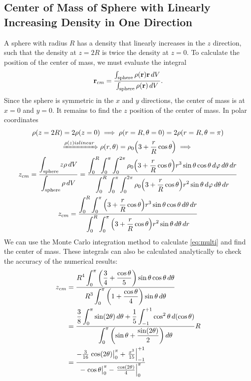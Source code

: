 \documentclass[12pt,a4paper]{article}
\newcommand{\ddfrac}[2]{{\displaystyle\frac{\displaystyle #1}{\displaystyle #2}}}
\begin{document}
    \subsection{Center of Mass of Sphere with Linearly Increasing Density in One Direction}
    A sphere with radius $R$ has a density that linearly increases in the $z$ direction, such that the density at $z=2R$
    is twice the density at $z=0$. To calculate the position of the center of mass, we must evaluate the integral
    \begin{equation}
        \vb{r}_{cm} = \frac{\int_{\text{sphere}}\rho(\vb{r})\vb{r}\dd{V}}{\int_{\text{sphere}}\rho(\vb{r})\dd{V}}.
    \end{equation}
    Since the sphere is symmetric in the $x$ and $y$ directions, the center of mass is at $x=0$ and $y=0$. It remains to
    find the $z$ position of the center of mass. In polar coordinates
    \begin{gather}
        \rho(z=2R) = 2\rho(z=0) \implies \rho(r=R, \theta=0) = 2\rho(r=R, \theta=\pi) \\
        \xRightarrow{\rho(z) is linear} \rho(r, \theta) = \rho_0\qty(3+\frac{r}{R}\cos{\theta}) \implies \\
        z_{cm} = \ddfrac{\int_{\text{sphere}}z\rho\dd{V}}{\int_{\text{sphere}}\rho\dd{V}} =
        \ddfrac{\int_0^R\int_0^\pi\int_0^{2\pi} \rho_0\qty(3+\frac{r}{R}\cos{\theta})r^3\sin{\theta}\cos{\theta}
        \dd{\varphi}\dd{\theta}\dd{r}}{\int_0^R\int_0^\pi\int_0^{2\pi} \rho_0\qty(3+\frac{r}{R}\cos{\theta})r^2
        \sin{\theta}\dd{\varphi}\dd{\theta}\dd{r}} \\
        z_{cm} = \ddfrac{\int_0^R\int_0^\pi \qty(3+\frac{r}{R}\cos{\theta})r^3\sin{\theta}\cos{\theta}
        \dd{\theta}\dd{r}}{\int_0^R\int_0^\pi \qty(3+\frac{r}{R}\cos{\theta})r^2\sin{\theta}
        \dd{\theta}\dd{r}} \label{eq:multi}
    \end{gather}
    We can use the Monte Carlo integration method to calculate \eqref{eq:multi} and find the center of mass.
    These integrals can also be calculated analytically to check the accuracy of the numerical results:
    \begin{align}
        z_{cm} &= \ddfrac{R^4 \int_0^\pi \qty(\frac{3}{4}+\frac{\cos{\theta}}{5})\sin{\theta}\cos{\theta}\dd{\theta}}
        {R^3 \int_0^\pi \qty(1+\frac{\cos{\theta}}{4})\sin{\theta}\dd{\theta}} \\
        &= \ddfrac{\frac{3}{8}\int_0^\pi\sin(2\theta)\dd{\theta} + \frac{1}{5}\int_{-1}^{+1}\cos^2{\theta}
        \dd{(\cos{\theta})}} {\int_0^\pi\qty(\sin{\theta} + \frac{\sin(2\theta)}{2})\dd{\theta}}R \\
        &= \frac{-\frac{3}{16}\eval{\cos(2\theta)}_0^\pi + \eval{\frac{x^3}{15}}_{-1}^{+1}}
        {-\eval{\cos{\theta}}_0^\pi - \eval{\frac{\cos(2\theta)}{4}}_0^\pi}
    \end{align}
\end{document}
